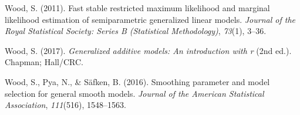 \documentclass[print]{nuthesis}
\newlength{\cslhangindent}
\newenvironment{CSLReferences}[2]%
{\setlength{\parindent}{0pt}%
\everypar{\setlength{\hangindent}{\cslhangindent}}\ignorespaces}%
{\par}
\begin{document}
\begin{CSLReferences}{1}{0}
\leavevmode{}%
Wood, S. (2011). Fast stable restricted maximum likelihood and marginal likelihood estimation of semiparametric generalized linear models. \emph{Journal of the Royal Statistical Society: Series B (Statistical Methodology)}, \emph{73}(1), 3--36.

\leavevmode{}%
Wood, S. (2017). \emph{Generalized additive models: An introduction with r} (2nd ed.). Chapman; Hall/CRC.

\leavevmode{}%
Wood, S., Pya, N., \& Säfken, B. (2016). Smoothing parameter and model selection for general smooth models. \emph{Journal of the American Statistical Association}, \emph{111}(516), 1548--1563.

\end{CSLReferences}


\backmatter

% 






\end{document}
